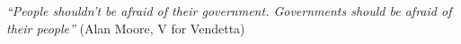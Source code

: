 
\begin{epigrafe}

\textit{``People shouldn't be afraid of their government. Governments should be afraid of their people''}
(Alan Moore, V for Vendetta)

\end{epigrafe}

